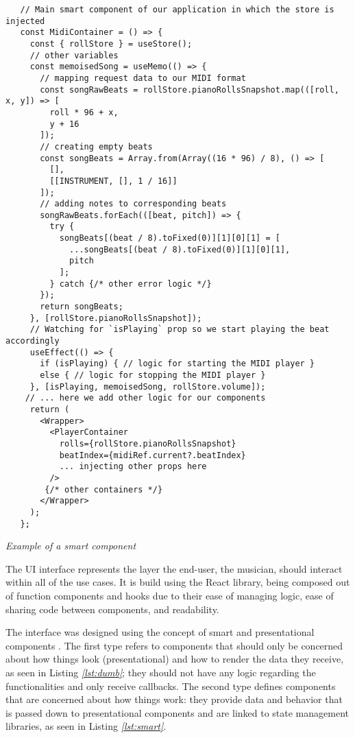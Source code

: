 \begin{listing}
  \begin{verbatim}
   // Main smart component of our application in which the store is injected
   const MidiContainer = () => {
     const { rollStore } = useStore();
     // other variables
     const memoisedSong = useMemo(() => {
       // mapping request data to our MIDI format
       const songRawBeats = rollStore.pianoRollsSnapshot.map(([roll, x, y]) => [
         roll * 96 + x,
         y + 16
       ]);
       // creating empty beats
       const songBeats = Array.from(Array((16 * 96) / 8), () => [
         [],
         [[INSTRUMENT, [], 1 / 16]]
       ]);
       // adding notes to corresponding beats
       songRawBeats.forEach(([beat, pitch]) => {
         try {
           songBeats[(beat / 8).toFixed(0)][1][0][1] = [
             ...songBeats[(beat / 8).toFixed(0)][1][0][1],
             pitch
           ];
         } catch {/* other error logic */}
       });
       return songBeats;
     }, [rollStore.pianoRollsSnapshot]);
     // Watching for `isPlaying` prop so we start playing the beat accordingly
     useEffect(() => {
       if (isPlaying) { // logic for starting the MIDI player }
       else { // logic for stopping the MIDI player }
     }, [isPlaying, memoisedSong, rollStore.volume]);
    // ... here we add other logic for our components
     return (
       <Wrapper>
         <PlayerContainer
           rolls={rollStore.pianoRollsSnapshot}
           beatIndex={midiRef.current?.beatIndex}
           ... injecting other props here
         />
        {/* other containers */}
       </Wrapper>
     );
   };
  \end{verbatim}
  \caption{\emph{Example of a smart component}}
  \label{lst:smart}
\end{listing}


The UI interface represents the layer the end-user,
the musician, should interact within all of the use cases.
It is build using the React library,
being composed out of function components and hooks due
to their ease of managing logic,
ease of sharing code between components, and readability.

The interface was designed using the concept of smart and presentational
components \cite{smart_dumb}. The first type refers to components that
should only be concerned about how things look (presentational)
and how to render the data they receive, as seen in Listing \emph{\ref{lst:dumb}};
they should not have any logic regarding the functionalities and
only receive callbacks. The second type defines components
that are concerned about how things work:
they provide data and behavior that is passed down
to presentational components and are linked to state management
libraries, as seen in Listing \emph{\ref{lst:smart}}.

